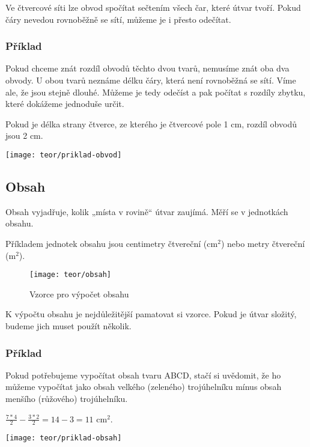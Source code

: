 Ve čtvercové síti lze obvod spočítat sečtením všech čar, které útvar tvoří. Pokud čáry nevedou rovnoběžně se sítí, můžeme je i přesto odečítat.

\subsubsection{Příklad}
\begin{minipage}[t]{\linewidth}
    Pokud chceme znát rozdíl obvodů těchto dvou tvarů, nemusíme znát oba dva obvody. U obou tvarů neznáme délku čáry, která není rovnoběžná se sítí. Víme ale, že jsou stejně dlouhé. Můžeme je tedy odečíst a pak počítat s rozdíly zbytku, které dokážeme jednoduše určit.

    Pokud je délka strany čtverce, ze kterého je čtvercové pole 1 cm, rozdíl obvodů jsou 2 cm.
    \begin{center}
        \texttt{[image: teor/priklad-obvod]}
    \end{center}
\end{minipage}

\subsection{Obsah}
Obsah vyjadřuje, kolik „místa v rovině“ útvar zaujímá. Měří se v jednotkách obsahu.~\cite{umim_mat}

Příkladem jednotek obsahu jsou centimetry čtvereční ($\text{cm}^{2}$) nebo metry čtvereční ($\text{m}^{2}$).
\begin{figure}[p]
    \caption{Vzorce pro výpočet obsahu~\cite{umim_mat}}
    \centering
    \texttt{[image: teor/obsah]}
\end{figure}


K výpočtu obsahu je nejdůležitější pamatovat si vzorce. Pokud je útvar složitý, budeme jich muset použít několik.

\subsubsection{Příklad}
\begin{minipage}[t]{\linewidth}
    Pokud potřebujeme vypočítat obsah tvaru ABCD, stačí si uvědomit, že ho můžeme vypočítat jako obsah velkého (zeleného) trojúhelníku mínus obsah menšího (růžového) trojúhelníku.

    $ \frac{7*4}{2} - \frac{3*2}{2} =  14 - 3 = 11 \text{ cm}^{2}$.
    \begin{center}
        \texttt{[image: teor/priklad-obsah]}
    \end{center}
\end{minipage}

